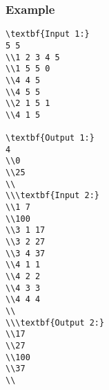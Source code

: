 \subsubsection{   Example  }
\begin{verbatim}
\textbf{Input 1:}
5 5 
\\1 2 3 4 5 
\\1 5 5 0 
\\4 4 5 
\\4 5 5 
\\2 1 5 1 
\\4 1 5

\textbf{Output 1:}
4
\\0
\\25 
\\
\\\textbf{Input 2:}
\\1 7 
\\100 
\\3 1 17 
\\3 2 27 
\\3 4 37 
\\4 1 1 
\\4 2 2 
\\4 3 3 
\\4 4 4
\\
\\\textbf{Output 2:}
\\17 
\\27 
\\100
\\37
\\\end{verbatim}
